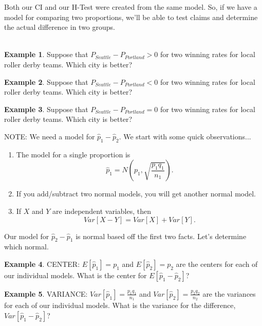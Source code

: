 \documentclass[12pt]{amsart}
\theoremstyle{definition}
\newtheorem{ex}{Example}
\begin{document}
Both our CI and our H-Test were created from the same model. So, if we have a model for comparing two proportions, we'll be able to test claims and determine the actual difference in two groups.\\
~\\
\begin{ex} Suppose that $P_{Seattle}-P_{Portland}>0$ for two winning rates for local roller derby teams. Which city is better?\end{ex} \vfill

\begin{ex} Suppose that $P_{Seattle}-P_{Portland}<0$ for two winning rates for local roller derby teams. Which city is better?\end{ex} \vfill

\begin{ex} Suppose that $P_{Seattle}-P_{Portland}=0$ for two winning rates for local roller derby teams. Which city is better?\end{ex} \vfill

NOTE:
\newpage
We need a model for $\hat{p}_1-\hat{p}_2$. We start with some quick observations...
\begin{enumerate}
 \item The model for a single proportion is $$\hat{p}_1=N\left(p_1,\sqrt{\frac{p_1q_1}{n_1}} \right).$$
 \item If you add/subtract two normal models, you will get another normal model.
 \item If $X$ and $Y$ are independent variables, then $$Var[X-Y]=Var[X]+Var[Y].$$
\end{enumerate}

Our model for $\hat{p}_2-\hat{p}_1$ is normal based off the first two facts. Let's determine which normal.

\begin{ex} CENTER: $E[\hat{p}_1]=p_1$ and $E[\hat{p}_2]=p_2$ are the centers for each of our individual models. What is the center for $E[\hat{p}_1-\hat{p}_2]$?
\end{ex}

\vspace{1in}

\begin{ex} VARIANCE: $Var[\hat{p}_1]=\frac{p_1q_1}{n_1}$ and $Var[\hat{p}_2]=\frac{p_2q_2}{n_2}$ are the variances for each of our individual models. What is the variance for the difference, $Var[\hat{p}_1-\hat{p}_2]$?
\end{ex}

\vspace{1.5in}
\end{document}
